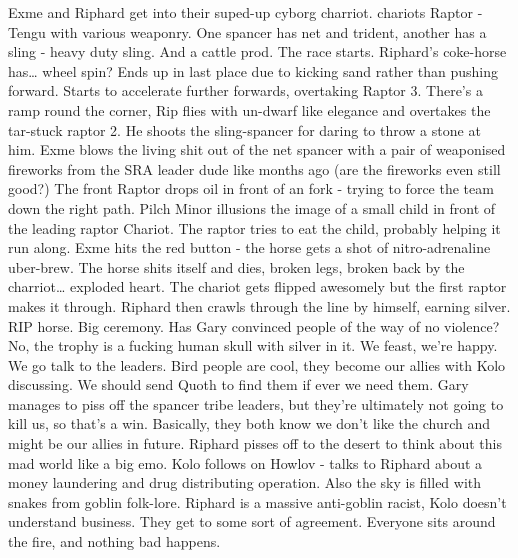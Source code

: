 Exme and Riphard get into their suped-up cyborg charriot. chariots Raptor - Tengu with various weaponry.\medskip
One spancer has net and trident, another has a sling - heavy duty sling. And a cattle prod.\medskip
The race starts.\medskip
Riphard’s coke-horse has… wheel spin? Ends up in last place due to kicking sand rather than pushing forward.\medskip
Starts to accelerate further forwards, overtaking Raptor 3.\medskip
There’s a ramp round the corner, Rip flies with un-dwarf like elegance and overtakes the tar-stuck raptor 2.\medskip
He shoots the sling-spancer for daring to throw a stone at him.\medskip
Exme blows the living shit out of the net spancer with a pair of weaponised fireworks from the SRA leader dude like months ago (are the fireworks even still good?)\medskip
The front Raptor drops oil in front of an fork - trying to force the team down the right path.\medskip
Pilch Minor illusions the image of a small child in front of the leading raptor Chariot. The raptor tries to eat the child, probably helping it run along.\medskip
Exme hits the red button - the horse gets a shot of nitro-adrenaline uber-brew. The horse shits itself and dies, broken legs, broken back by the charriot… exploded heart. The chariot gets flipped awesomely but the first raptor makes it through. Riphard then crawls through the line by himself, earning silver.\medskip
RIP horse.\medskip
Big ceremony. Has Gary convinced people of the way of no violence? No, the trophy is a fucking human skull with silver in it.\medskip
We feast, we’re happy. We go talk to the leaders.\medskip
Bird people are cool, they become our allies with Kolo discussing. We should send Quoth to find them if ever we need them.\medskip
Gary manages to piss off the spancer tribe leaders, but they’re ultimately not going to kill us, so that’s a win.\medskip
Basically, they both know we don’t like the church and might be our allies in future.\medskip
Riphard pisses off to the desert to think about this mad world like a big emo.\medskip
Kolo follows on Howlov - talks to Riphard about a money laundering and drug distributing operation. Also the sky is filled with snakes from goblin folk-lore.\medskip
Riphard is a massive anti-goblin racist, Kolo doesn’t understand business. They get to some sort of agreement.\medskip
Everyone sits around the fire, and nothing bad happens.